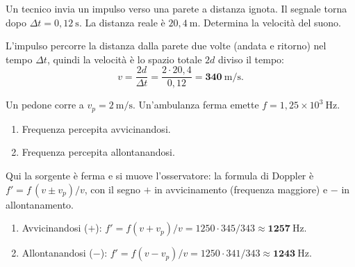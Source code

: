 \begin{question}[ID=2.5, subtitle={Misura della velocità del suono con impulso riflesso}, tags={eco, riflessione, velocità}, difficulty=media]
Un tecnico invia un impulso verso una parete a distanza ignota. Il segnale torna dopo $\Delta t = 0{,}12\ \mathrm{s}$. La distanza reale è $20{,}4\ \mathrm{m}$. Determina la velocità del suono.
\begin{solution}
L'impulso percorre la distanza dalla parete due volte (andata e ritorno) nel tempo $\Delta t$, quindi la velocità è lo spazio totale $2d$ diviso il tempo:
\[
v = \frac{2d}{\Delta t} = \frac{2\cdot 20{,}4}{0{,}12} = \mathbf{340\ \mathrm{m/s}}.
\]
\end{solution}
\end{question}

\begin{question}[ID=3.1, subtitle={Pedone che si avvicina e allontana da ambulanza ferma}, tags={effetto doppler, suono}, difficulty=facile]
Un pedone corre a $v_p = 2\ \mathrm{m/s}$. Un'ambulanza ferma emette $f = 1{,}25\times10^3\ \mathrm{Hz}$.
\begin{enumerate}
\item Frequenza percepita avvicinandosi.
\item Frequenza percepita allontanandosi.
\end{enumerate}
\begin{solution}
Qui la sorgente è ferma e si muove l'osservatore: la formula di Doppler è $f' = f\,(v \pm v_p)/v$, con il segno $+$ in avvicinamento (frequenza maggiore) e $-$ in allontanamento.
\begin{enumerate}
\item Avvicinandosi ($+$): $f' = f(v+v_p)/v = 1250\cdot 345/343 \approx \mathbf{1257\ \mathrm{Hz}}$.
\item Allontanandosi ($-$): $f' = f(v-v_p)/v = 1250\cdot 341/343 \approx \mathbf{1243\ \mathrm{Hz}}$.
\end{enumerate}
\end{solution}
\end{question}

